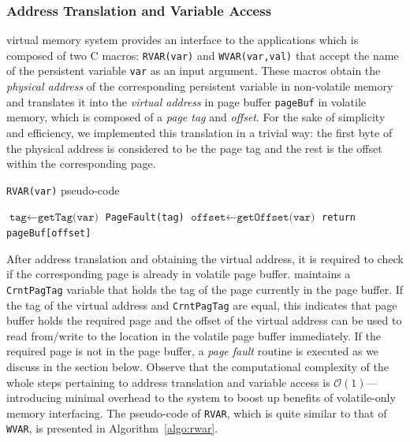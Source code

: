 \subsubsection{Address Translation and Variable Access}

\sys virtual memory system provides an interface to the applications which is composed of two C macros: \texttt{RVAR(var)} and \texttt{WVAR(var,val)} that accept the name of the persistent variable \texttt{var} as an input argument. These macros obtain the \emph{physical address} of the corresponding persistent variable in non-volatile memory and translates it into the \emph{virtual address} in page buffer \texttt{pageBuf} in volatile memory, which is composed of a \emph{page tag} and \emph{offset}. For the sake of simplicity and efficiency, we implemented this translation in a trivial way: the first byte of the physical address is considered to be the page tag and the rest is the offset within the corresponding page. 

\begin{algorithm}[t]
	\caption{\texttt{RVAR(var)} pseudo-code}
	\label{algo:rwar}
	\scriptsize
	\begin{algorithmic}[1]
		\State $\texttt{tag}\leftarrow \texttt{getTag(var)}$ 
			
		\State	\texttt{PageFault(tag)} 
		\EndIf
				\State $\texttt{offset}\leftarrow \texttt{getOffset(var)}$ 		
		\State \texttt{return pageBuf[offset]}  
	\end{algorithmic}
\end{algorithm}

After address translation and obtaining the virtual address, it is required to check if the corresponding page is already in volatile page buffer. \sys maintains a \texttt{CrntPagTag} variable that holds the tag of the page currently in the page buffer. If the tag of the virtual address and \texttt{CrntPagTag} are equal, this indicates that page buffer holds the required page and the offset of the virtual address can be used to read from/write to the location in the volatile page buffer immediately. If the required page is not in the page buffer, a \emph{page fault} routine is executed as we discuss in the section below. Observe that the computational complexity of the whole steps pertaining to address translation and variable access is $\mathcal{O}(1)$---introducing minimal overhead to the system to boost up benefits of volatile-only memory interfacing. The pseudo-code of \texttt{RVAR}, which is quite similar to that of \texttt{WVAR}, is presented in Algorithm~\ref{algo:rwar}.

